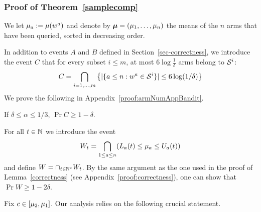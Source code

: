 \subsubsection{Proof of Theorem~\ref{samplecomp}} \label{sec-proof}

We let $\mu_a := \mu(w^a)$ and
denote by $\bm{\mu} = (\mu_1,\dots,\mu_n)$ the means of the $n$ arms that have been queried, sorted in decreasing order. 

In addition to events $A$ and $B$ defined in Section~\ref{sec-correctness}, we introduce the event $C$ that for every subset $i \leq m$, at most $6\log\frac{1}{\delta}$
        arms belong to $\mathcal{S}^{i}$:
\begin{align}
C = \bigcap_{i = 1,\dots,m} \left\{|\{ a \leq n : w^a \in \mathcal{S}^{i}\}| \leq 6\log({1}/{\delta})\right\}
\end{align}
We prove the following in
Appendix~\ref{proof:armNumAppBandit}.

\begin{lemma}\label{lem-armNumAppBandit} If $\delta \leq \alpha \leq 1/3$,
$\Pr{ C } \geq 1-\delta$.
\end{lemma}

For all $t\in\mathbb{N}$ we introduce the event 
\begin{align}
W_t = \bigcap_{1\leq a \leq n} (L_a(t) \leq \mu_a \leq U_a(t))
\end{align}
and define $W = \cap_{t\in\mathbb{N}^*} W_t$. By the same argument as the one used in the proof of Lemma~\ref{correctness} (see
Appendix~\ref{proof:correctness}),
one 
can show that $\Pr{ W } \geq 1-2\delta.$

Fix $c \in [\mu_2,\mu_1]$. Our analysis relies on the following crucial statement.

